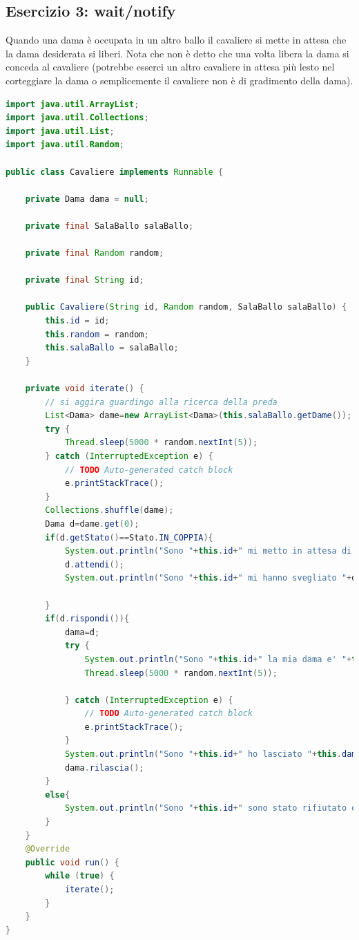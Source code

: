 \documentclass{article}
\begin{document}
\subsection{Esercizio 3: wait/notify}
\begin{framed}
Quando una dama \`e occupata in un altro ballo il cavaliere si mette in attesa che la dama desiderata si liberi. Nota che non \`e detto che una volta libera la dama si conceda al cavaliere (potrebbe esserci un altro cavaliere in attesa pi\`u lesto nel corteggiare la dama o semplicemente il cavaliere non \`e di gradimento della dama).
\end{framed}
\begin{lstlisting}[language=Java]
import java.util.ArrayList;
import java.util.Collections;
import java.util.List;
import java.util.Random;

public class Cavaliere implements Runnable {

	private Dama dama = null;

	private final SalaBallo salaBallo;

	private final Random random;

	private final String id;

	public Cavaliere(String id, Random random, SalaBallo salaBallo) {
		this.id = id;
		this.random = random;
		this.salaBallo = salaBallo;
	}

	private void iterate() {
		// si aggira guardingo alla ricerca della preda
		List<Dama> dame=new ArrayList<Dama>(this.salaBallo.getDame());
		try {
			Thread.sleep(5000 * random.nextInt(5));
		} catch (InterruptedException e) {
			// TODO Auto-generated catch block
			e.printStackTrace();
		}
		Collections.shuffle(dame);
		Dama d=dame.get(0);
		if(d.getStato()==Stato.IN_COPPIA){
			System.out.println("Sono "+this.id+" mi metto in attesa di "+d.getName());
			d.attendi();
			System.out.println("Sono "+this.id+" mi hanno svegliato "+d.getName()+" si e' lasciata");
			
		}
		if(d.rispondi()){
			dama=d;
			try {
				System.out.println("Sono "+this.id+" la mia dama e' "+this.dama.getName());
				Thread.sleep(5000 * random.nextInt(5));
				
			} catch (InterruptedException e) {
				// TODO Auto-generated catch block
				e.printStackTrace();
			}
			System.out.println("Sono "+this.id+" ho lasciato "+this.dama.getName());
			dama.rilascia();
		}
		else{
			System.out.println("Sono "+this.id+" sono stato rifiutato da "+d.getName());
		}
	}
	@Override
	public void run() {
		while (true) {
			iterate();
		}
	}
}
\end{lstlisting}
\end{document}
